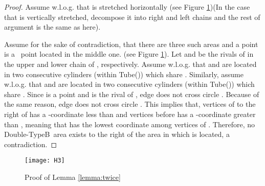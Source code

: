 \documentclass[a4paper,UKenglish]{lipics}
\newcommand{\REM}[1]{}
\newcommand{\DoubleB}{Double-TypeB}
\begin{document}
\begin{proof}

Assume w.l.o.g. that  is stretched horizontally (see Figure \ref{fig:twice})(In the case that  is vertically stretched, decompose 
it into right and left chains and the rest of 
argument is the same as here).  


Assume for the sake of contradiction,
that there are three such areas and 
a point  is a \TwiceB ~point located in the middle one.
(see Figure \ref{fig:twice}). 
Let  and  be the rivals of  in the upper 
and lower chain of , respectively. 
Assume w.l.o.g. that  and 
are located in two consecutive cylinders (within Tube()) which 
share . 
Similarly, assume w.l.o.g. that  and 
are located in two consecutive cylinders (within Tube()) which 
share .
Since  is a  point and  is the rival of , 
edge  does not cross circle . 
Because of the same reason, edge  does not cross circle . 
This implies that, vertices of  to the right of  has 
a -coordinate less than  and vertices before   
has a -coordinate greater than , meaning that 
has the lowest  coordinate among vertices of .
Therefore, no \DoubleB~area exists to the right of the 
area in which  is located, a contradiction.






\REM{
To prove the lemma, we first investigate a situation where 
a point is in more than one reachability sets and then from there, we establish
the lemma.


If  is in  and , 
then it is  point at .
Let  be a vertex of the polygon and  be 
the circle shared between  and . 

 

One of these two cases may happen here: (i) point  lies in
 (see Figure \ref{fig:twice}a), 
then obviously  is a  point at 
(ii)  point  doesn't lie in
 (see Figure \ref{fig:twice}b), we show 
that although  could not 
cross , 
but still  is a  point at :

Assume for the sake of contradiction, that 
 is  point at .
Thus, by the definition of  points, 
no semi-feasible 
curve exists which contains  as its vertex
and ends at .
Therefore, since , 
it must be located entirely after 
 in 
(for example, in Figure \ref{fig:twice}b,  
can be located at the place where  is). This contradicts 
the fact that  is in (or located within ).
}
\end{proof}



\begin{figure}[t]
	\centering
	\texttt{[image: H3]}
	\caption{Proof of Lemma \ref{lemma:twice}}
	\label{fig:twice}
\end{figure}
\end{document}
